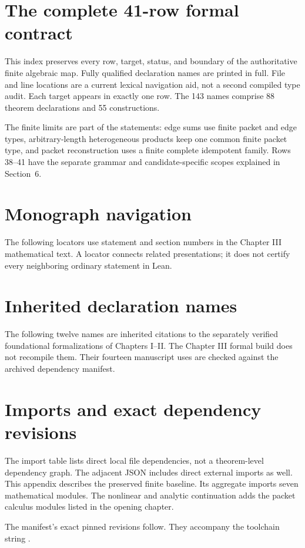 \tableofcontents
\clearpage
{}

\clearpage







\clearpage
\section{The complete 41-row formal contract}\label{sec:map}
This index preserves every row, target, status, and boundary of the authoritative finite algebraic map. Fully qualified declaration names are printed in full. File and line locations are a current lexical navigation aid, not a second compiled type audit. Each target appears in exactly one row. The 143 names comprise 88 theorem declarations and 55 constructions.

The finite limits are part of the statements: edge sums use finite packet and edge types, arbitrary-length heterogeneous products keep one common finite packet type, and packet reconstruction uses a finite complete idempotent family. Rows 38--41 have the separate grammar and candidate-specific scopes explained in Section~6.

\clearpage
\appendix
\section{Monograph navigation}\label{app:crosswalk}
The following locators use statement and section numbers in the Chapter III mathematical text. A locator connects related presentations; it does not certify every neighboring ordinary statement in Lean.

\section{Inherited declaration names}\label{app:inherited}
The following twelve names are inherited citations to the separately verified foundational formalizations of Chapters I--II. The Chapter III formal build does not recompile them. Their fourteen manuscript uses are checked against the archived dependency manifest.

\clearpage
\section{Imports and exact dependency revisions}
The import table lists direct local file dependencies, not a theorem-level dependency graph. The adjacent JSON includes direct external imports as well. This appendix describes the preserved finite baseline. Its aggregate imports seven mathematical modules. The nonlinear and analytic continuation adds the packet calculus modules listed in the opening chapter.

The manifest's exact pinned revisions follow. They accompany the toolchain string .

\clearpage

